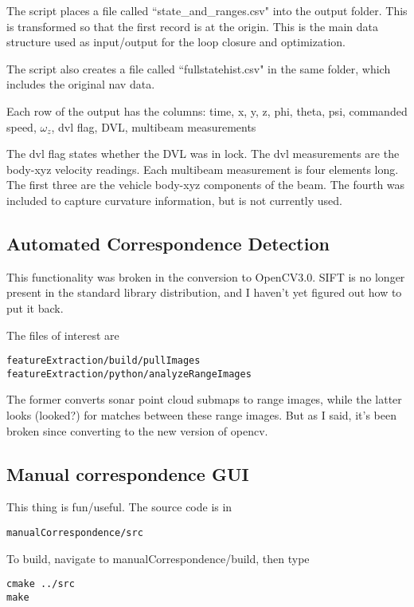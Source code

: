 \documentclass[12pt]{amsart}
\begin{document}
The script places a file called ``state\_and\_ranges.csv" into the output folder. This is transformed so that the first record is at the origin. This is the main data structure used as input/output for the loop closure and optimization. 

The script also creates a file called ``fullstatehist.csv" in the same folder, which includes the original nav data.

Each row of the output has the columns:
time, x, y, z, phi, theta, psi, commanded speed, $\omega_z$, dvl flag, DVL, multibeam measurements

The dvl flag states whether the DVL was in lock. The dvl measurements are the body-xyz velocity readings. Each multibeam measurement is four elements long. The first three are the vehicle body-xyz components of the beam. The fourth was included to capture curvature information, but is not currently used.

\subsection{Automated Correspondence Detection}

This functionality was broken in the conversion to OpenCV3.0. SIFT is no longer present in the standard library distribution, and I haven't yet figured out how to put it back. 

The files of interest are
\begin{lstlisting}
featureExtraction/build/pullImages
featureExtraction/python/analyzeRangeImages
\end{lstlisting}

The former converts sonar point cloud submaps to range images, while the latter looks (looked?) for matches between these range images. But as I said, it's been broken since converting to the new version of opencv.

\subsection{Manual correspondence GUI}

This thing is fun/useful. The source code is in 
\begin{lstlisting}
manualCorrespondence/src
\end{lstlisting}

To build, navigate to manualCorrespondence/build, then type 

\begin{lstlisting}
cmake ../src
make
\end{lstlisting}
\end{document}
